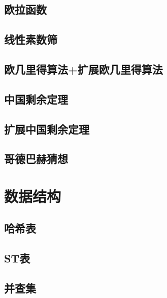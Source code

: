 \documentclass[twocolumn,a4]{article}  %
\begin{document}
	 	\subsection{欧拉函数}
	 	 	
	
	 	\subsection{线性素数筛}
	 	 	

	 	\subsection{欧几里得算法+扩展欧几里得算法}
	 	 	
	
	 	\subsection{中国剩余定理}
	 	 	
	
	 	\subsection{扩展中国剩余定理}
	 	 	
	 	 	
	 	\subsection{哥德巴赫猜想}
	 	 	
	
	\section{数据结构}
		\subsection{哈希表}
			
			
		\subsection{ST表}
	 	 	
	 	 	
	 	\subsection{并查集}
	 	 	
	 	 	
\end{document}
